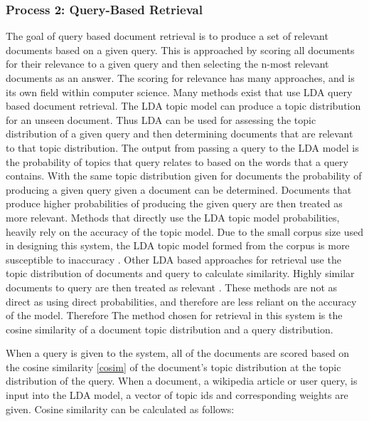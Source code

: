 \subsubsection{Process 2: Query-Based Retrieval}
The goal of query based document retrieval is to produce a set of relevant documents based on a given query. This is approached by scoring all documents for their relevance to a given query and then selecting the n-most relevant documents as an answer. The scoring for relevance has many approaches, and is its own field within computer science. Many methods exist that use LDA query based document retrieval. The LDA topic model can produce a topic distribution for an unseen document. Thus LDA can be used for assessing the topic distribution of a given query and then determining documents that are relevant to that topic distribution. The output from passing a query to the LDA model is the probability of topics that query relates to based on the words that a query contains. With the same topic distribution given for documents the probability of producing a given query given a document can be determined. Documents that produce higher probabilities of producing the given query are then treated as more relevant. Methods that directly use the LDA topic model probabilities, heavily rely on the accuracy of the topic model. Due to the small corpus size used in designing this system, the LDA topic model formed from the corpus is more susceptible to inaccuracy \citep{crossley2017important}. Other LDA based approaches for retrieval use the topic distribution of documents and query to calculate similarity. Highly similar documents to query are then treated as relevant \citep{steyvers2007probabilistic}. These methods are not as direct as using direct probabilities, and therefore are less reliant on the accuracy of the model. Therefore The method chosen for retrieval in this system is the cosine similarity of a document topic distribution and a query distribution.

When a query is given to the system, all of the documents are scored based on the cosine similarity \ref{cosim} of the document’s topic distribution at the topic distribution of the query. When a document, a wikipedia article or user query, is input into the LDA model, a vector of topic ids and corresponding weights are given. Cosine similarity can be calculated as follows:

